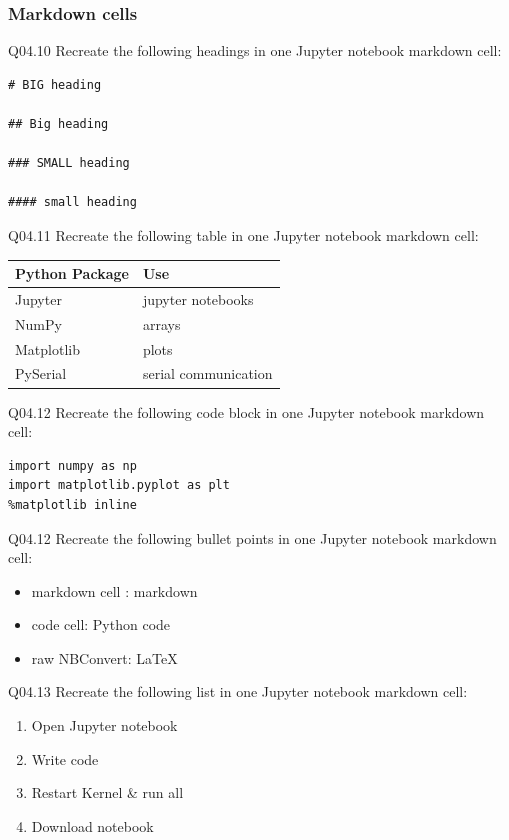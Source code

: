 \documentclass{book}
\newenvironment{problems}{}{}  %
\providecommand{\tightlist}{%
      \setlength{\itemsep}{0pt}\setlength{\parskip}{0pt}}
\begin{document}
    
        \begin{problems}
        \subsubsection{Markdown cells}\label{markdown-cells}

Q04.10 Recreate the following headings in one Jupyter notebook markdown
cell:

\begin{lstlisting}
# BIG heading

## Big heading

### SMALL heading

#### small heading
\end{lstlisting}

Q04.11 Recreate the following table in one Jupyter notebook markdown
cell:

\begin{longtable}[]{@{}ll@{}}
\toprule
Python Package & Use\tabularnewline
\midrule
\endhead
Jupyter & jupyter notebooks\tabularnewline
NumPy & arrays\tabularnewline
Matplotlib & plots\tabularnewline
PySerial & serial communication\tabularnewline
\bottomrule
\end{longtable}

Q04.12 Recreate the following code block in one Jupyter notebook
markdown cell:

\begin{lstlisting}
import numpy as np
import matplotlib.pyplot as plt
%matplotlib inline
\end{lstlisting}

Q04.12 Recreate the following bullet points in one Jupyter notebook
markdown cell:

\begin{itemize}
\tightlist
\item
  markdown cell : markdown
\item
  code cell: Python code
\item
  raw NBConvert: LaTeX
\end{itemize}

Q04.13 Recreate the following list in one Jupyter notebook markdown
cell:

\begin{enumerate}
\def\labelenumi{\arabic{enumi}.}
\tightlist
\item
  Open Jupyter notebook
\item
  Write code
\item
  Restart Kernel \& run all
\item
  Download notebook
\end{enumerate}


\end{problems}
\end{document}
